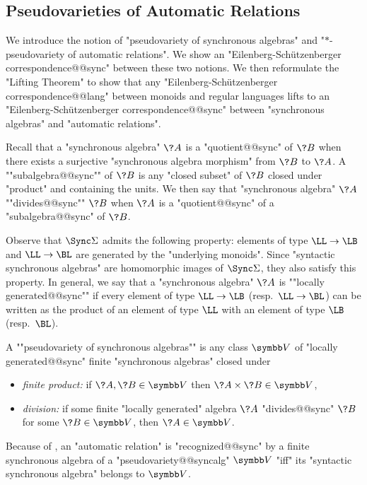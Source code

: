 \subsection{Pseudovarieties of Automatic Relations}
\label{sec:varieties}

We introduce the notion of "pseudovariety of synchronous algebras" 
and "$\ast$-pseudovariety of automatic relations". We show an "Eilenberg-Schützenberger correspondence@@sync" between these two notions. We then reformulate the "Lifting Theorem"
to show that any "Eilenberg-Schützenberger correspondence@@lang" between monoids and regular languages
lifts to an "Eilenberg-Schützenberger correspondence@@sync" between "synchronous algebras" and "automatic relations".

Recall that a "synchronous algebra" $\?A$ is a "quotient@@sync" of $\?B$
when there exists a surjective "synchronous algebra morphism" from $\?B$ to $\?A$.
A ""subalgebra@@sync"" of $\?B$ is any "closed subset" of $\?B$ closed under "product"
and containing the units.
We then say that "synchronous algebra" $\?A$ \AP""divides@@sync"" $\?B$
when $\?A$ is a "quotient@@sync" of a "subalgebra@@sync" of $\?B$.

Observe that $\Sync\Sigma$ admits the following property:
elements of type $\LL\to\LB$ and $\LL\to\BL$ are generated by the "underlying monoids".
Since "syntactic synchronous algebras" are homomorphic images of $\Sync\Sigma$, they also
satisfy this property. In general, we say that a "synchronous algebra" $\?A$ is \AP""locally 
generated@@sync"" if every element of type $\LL\to\LB$ (resp.~$\LL\to\BL$)
can be written as the product of an element of type $\LL$ with an element of type $\LB$ (resp.~$\BL$).

A \AP""pseudovariety of synchronous algebras"" is any class $\B{V}$
of "locally generated@@sync" finite "synchronous algebras" closed under
\begin{itemize}
	\item \emph{finite product:} if $\?A, \?B \in \B{V}$ then $\?A \times \?B \in \B{V}$,
	\item \emph{division:} if some finite "locally generated" algebra $\?A$ "divides@@sync" $\?B$ for some $\?B \in \B{V}$, then $\?A \in \B{V}$.
\end{itemize}

Because of , an "automatic relation" is "recognized@@sync"
by a finite synchronous algebra of a "pseudovariety@@syncalg" $\B{V}$ "iff"
its "syntactic synchronous algebra" belongs to $\B{V}$.

